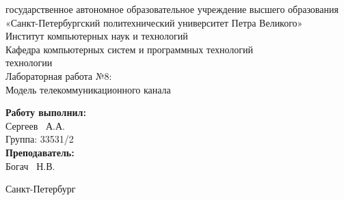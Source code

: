 \documentclass[a4paper]{article}
\begin{document}

\begin{titlepage}	%

	\begin{center}		%

		 государственное автономное образовательное учреждение высшего образования «Санкт-Петербургский
        политехнический университет Петра Великого» \\
		\large Институт компьютерных наук и технологий \\
		\large Кафедра компьютерных систем и программных технологий\\[2cm]
		
	    \vfill
		 технологии\\[0.5cm] %
		\large Лабораторная работа №8:\\
		Модель телекоммуникационного канала\\[4.8cm]

	\end{center}

	\begin{flushright} %
		\begin{minipage}{0.25\textwidth} %
			\begin{flushleft} %

				\large\textbf{Работу выполнил:}\\
				\large Сергеев ~А.А.\\
				\large {Группа:} 33531/2\\
				
				\large \textbf{Преподаватель:}\\
				\large Богач ~Н.В.\\

			\end{flushleft}
		\end{minipage}
	\end{flushright}
	
	\vfill %

	\begin{center}
	\large Санкт-Петербург\\
	\large \the\year %
	\end{center} %

\thispagestyle{empty} %
\end{titlepage} %
\vfill %
\end{document}

